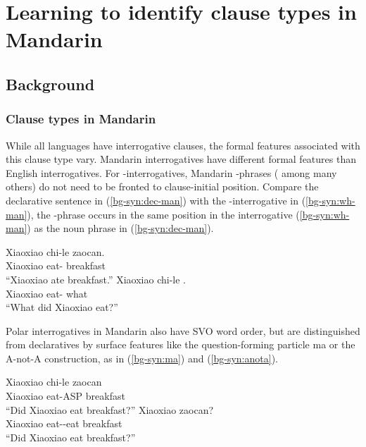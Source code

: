 \chapter{Learning to identify clause types in Mandarin}
\label{chap:man-cl}

\section{Background}
\label{sec:mancl:bg}
\subsection{Clause types in Mandarin}
\label{sec:mancl:bg:theory}


While all languages have interrogative clauses, the formal features associated with this clause type vary. Mandarin interrogatives have different formal features than English interrogatives. For \twh-interrogatives, Mandarin \twh-phrases (\citealt{huang1982, cheng1991} among many others) do not need to be fronted to clause-initial position. Compare the declarative sentence in (\ref{bg-syn:dec-man}) with the \twh-interrogative in (\ref{bg-syn:wh-man}), the \twh-phrase  occurs in the same position in the interrogative (\ref{bg-syn:wh-man}) as the noun phrase  in (\ref{bg-syn:dec-man}). 


\gll Xiaoxiao	chi-le zaocan.\\
Xiaoxiao eat-\Asp{} breakfast \\
``Xiaoxiao ate breakfast.''
\eex
{}
\gll Xiaoxiao	chi-le .\\
Xiaoxiao eat-\Asp{} what \\
``What did Xiaoxiao eat?''
\eex


Polar interrogatives in Mandarin also have SVO word order, but are distinguished from declaratives by surface features like the question-forming particle ma or the A-not-A construction, as in (\ref{bg-syn:ma}) and (\ref{bg-syn:anota}).

\gll Xiaoxiao	chi-le	zaocan		\\
Xiaoxiao	eat-ASP	breakfast	\Sfp{}\\
``Did Xiaoxiao eat breakfast?''
\eex
{}
\gll Xiaoxiao		zaocan?\\
	Xiaoxiao	eat-\Neg-eat	breakfast\\
	``Did Xiaoxiao eat breakfast?''
\eex


